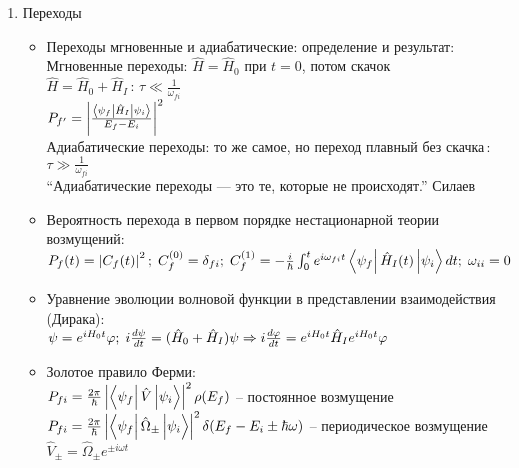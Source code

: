 \begin{enumerate}[label=\textbf{\underline{\arabic*.}}]
\begin{itemize}
        \end{itemize}
\item Переходы  \begin{itemize}
            \item Переходы мгновенные и адиабатические: определение и результат: \\
            Мгновенные переходы: $ \hat{H} = \hat{H}_0 $ при $ t=0 $, потом скачок $ \hat{H} = \hat{H}_0 + \hat{H}_I\,:\, \tau \ll \frac1{\omega_{fi}} $ \\
            $ P_{f'} = \abs{\frac{\matrixel{\psi_f}{\hat{H}_I}{\psi_i}}{E_f-E_i}}^2 $ \\
            Адиабатические переходы: то же самое, но переход плавный без скачка\,:\, $ \tau \gg \frac1{\omega_{fi}} $\\
            ``Адиабатические переходы --- это те, которые не происходят.'' Силаев
            \item Вероятность перехода в первом порядке нестационарной теории возмущений: \\
            $ P_f(t) = \abs{C_f(t)}^2;\; C_f^{(0)}=\delta_{fi};\; C_f^{(1)}=-\frac{i}{\hbar}\int_0^t e^{i\omega_{fi}t}\matrixel{\psi_f}{\hat{H}_I(t)}{\psi_i}dt;\;\omega_{ii}=0 $
            \item Уравнение эволюции волновой функции в представлении взаимодействия (Дирака): \\
            $ \psi=e^{iH_0t}\varphi;\; i\frac{d \psi}{d t}=(\hat{H}_0+\hat{H}_I)\psi \Rightarrow i\frac{d \varphi}{d t}=e^{iH_0t}\hat{H}_I e^{iH_0t}\varphi $
            \item Золотое правило Ферми: \\
            $ P_{fi} = \frac{2\pi}{\hbar}\abs{\matrixel{\psi_f}{\hat{V}}{\psi_i}}^2\rho(E_f) $ -- постоянное возмущение\\
            $ P_{fi} = \frac{2\pi}{\hbar}\abs{\matrixel{\psi_f}{\hat{\Omega}_\pm}{\psi_i}}^2\delta(E_f-E_i\pm \hbar\omega) $ -- периодическое возмущение $ \hat{V}_\pm=\hat{\Omega}_\pm e^{\pm i\omega t} $


\end{itemize}
\end{enumerate}
